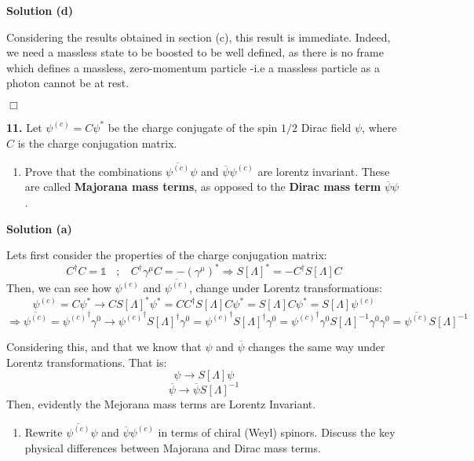 \documentclass[12pt]{article}
\newcommand{\qedwhite}{\hfill \ensuremath{\Box}}
\begin{document}
\color{blue}

\textbf{Solution (d)}

Considering the results obtained in section (c), this result is immediate. Indeed, we need a massless state to be boosted to be well defined, as there is no frame which defines a massless, zero-momentum particle -i.e a massless particle as a photon cannot be at rest.

\qedwhite

\color{black}

\textbf{11.} Let $\psi^{(c)} = C\psi^*$ be the charge conjugate of the spin $1/2$ Dirac field $\psi$, where $C$ is the charge conjugation matrix.
\begin{enumerate}[label=(\alph*), start = 1]
    \item Prove that the combinations $\overline{\psi^{(c)}}\psi$ and $\overline{\psi}\psi^{(c)}$ are lorentz invariant. These are called \textbf{Majorana mass terms}, as opposed to the \textbf{Dirac mass term} $\overline{\psi}\psi$.
\end{enumerate}

\color{blue}

\textbf{Solution (a)}

Lets first consider the properties of the charge conjugation matrix:
\[
    C^\dagger C = \mathbb{1} ~~~~;~~~~ C^\dagger \gamma^\mu C = -(\gamma^\mu)^* \Longrightarrow S[\Lambda]^* = -C^\dagger S[\Lambda] C
\]
Then, we can see how $\psi^{(c)}$ and $\overline{\psi^{(c)}}$, change under Lorentz transformations:
\[
    \psi^{(c)}=C\psi^* \longrightarrow  C S[\Lambda]^*\psi^* = C C^\dagger S[\Lambda] C\psi^* = S[\Lambda]C\psi^*= S[\Lambda]\psi^{(c)}
\]
\[
    \Longrightarrow \overline{\psi^{(c)}}={\psi^{(c)}}^\dagger\gamma^0 \longrightarrow {\psi^{(c)}}^\dagger S[\Lambda]^\dagger\gamma^0 = {\psi^{(c)}}^\dagger S[\Lambda]^\dagger\gamma^0 = {\psi^{(c)}}^\dagger \gamma^0 S[\Lambda]^{-1} \gamma^0\gamma^0 = \overline{\psi^{(c)}} S[\Lambda]^{-1}
\]

Considering this, and that we know that $\psi$ and $\overline{\psi}$ changes the same way under Lorentz transformations. That is:
\[
    \psi \longrightarrow S[\Lambda]\psi
\]
\[
    \overline{\psi} \longrightarrow \overline{\psi} S[\Lambda]^{-1}
\]
Then, evidently the Mejorana mass terms are Lorentz Invariant.

\color{black}

\begin{enumerate}[label=(\alph*), start = 2]
    \item Rewrite $\overline{\psi^{(c)}}\psi$ and $\overline{\psi}\psi^{(c)}$ in terms of chiral (Weyl) spinors. Discuss the key physical differences between Majorana and Dirac mass terms.
\end{enumerate}
\end{document}
